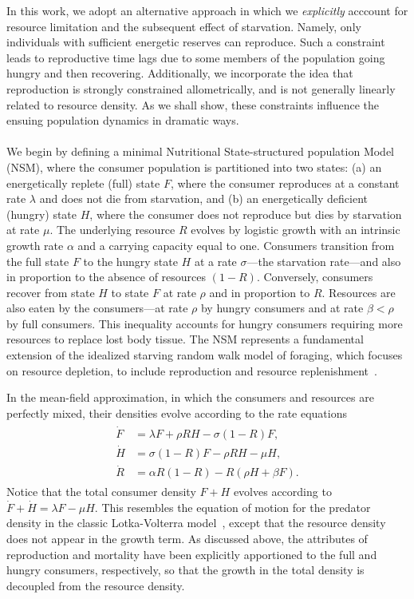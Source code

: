 \documentclass{pnastwo}
\begin{document}
\begin{article}
In this work, we adopt an alternative approach in which we \emph{explicitly}
acccount for resource limitation and the subsequent effect of starvation.
Namely, only individuals with sufficient energetic reserves can reproduce.
Such a constraint leads to reproductive time lags due to some members of the
population going hungry and then recovering.  Additionally, we incorporate
the idea that reproduction is strongly constrained
allometrically\cite{Kempes:2012hy}, and is not generally linearly related to
resource density.  As we shall show, these constraints influence the ensuing
population dynamics in dramatic ways.
\\

\\
We begin by defining a minimal Nutritional State-structured population Model
(NSM), where the consumer population is partitioned into two states: (a) an
energetically replete (full) state $F$, where the consumer reproduces at a
constant rate $\lambda$ and does not die from starvation, and (b) an
energetically deficient (hungry) state $H$, where the consumer does not
reproduce but dies by starvation at rate $\mu$.  The underlying resource $R$
evolves by logistic growth with an intrinsic growth rate $\alpha$ and a
carrying capacity equal to one.  Consumers transition from the full state $F$
to the hungry state $H$ at a rate $\sigma$---the starvation rate---and also
in proportion to the absence of resources $(1-R)$.  Conversely, consumers
recover from state $H$ to state $F$ at rate $\rho$ and in proportion to $R$.
Resources are also eaten by the consumers---at rate $\rho$ by hungry
consumers and at rate $\beta<\rho$ by full consumers.  This inequality
accounts for hungry consumers requiring more resources to replace lost body
tissue.  The NSM represents a fundamental extension of the idealized starving
random walk model of foraging, which focuses on resource depletion, to
include reproduction and resource
replenishment~\cite{PhysRevLett.113.238101,2016arXiv160500892B,PhysRevE.93.032403}.

In the mean-field approximation, in which the consumers and resources are
perfectly mixed, their densities evolve according to the rate equations
\begin{align} 
\label{eq:system}
\begin{split}
\dot{F} &= \lambda F + \rho RH - \sigma (1-R)F,  \\
\dot{H} &= \sigma (1-R)F - \rho RH - \mu H,  \\
\dot{R} &= \alpha R(1-R) - R(\rho H+ \beta F).
\end{split}
\end{align}
Notice that the total consumer density $F+H$ evolves according to
$\dot{F}+\dot{H}=\lambda F-\mu H$.  This resembles the equation of motion for
the predator density in the classic Lotka-Volterra model~\cite{Murray:2002},
except that the resource density does not appear in the growth term.  As
discussed above, the attributes of reproduction and mortality have been
explicitly apportioned to the full and hungry consumers, respectively, so
that the growth in the total density is decoupled from the resource density.


\end{article}
\end{document}
